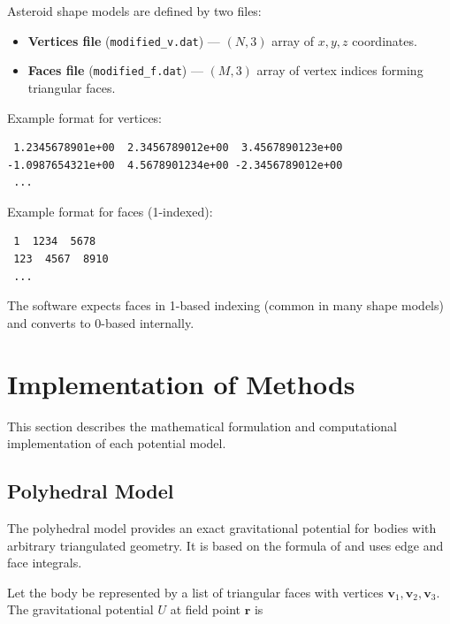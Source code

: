\documentclass[a4paper,12pt]{article}
\begin{document}
Asteroid shape models are defined by two files:
\begin{itemize}
    \item \textbf{Vertices file} (\texttt{modified\_v.dat}) — $(N, 3)$ array of $x, y, z$ coordinates.
    \item \textbf{Faces file} (\texttt{modified\_f.dat}) — $(M, 3)$ array of vertex indices forming triangular faces.
\end{itemize}

Example format for vertices:
\begin{verbatim}
 1.2345678901e+00  2.3456789012e+00  3.4567890123e+00
-1.0987654321e+00  4.5678901234e+00 -2.3456789012e+00
 ...
\end{verbatim}

Example format for faces (1-indexed):
\begin{verbatim}
 1  1234  5678
 123  4567  8910
 ...
\end{verbatim}

The software expects faces in 1-based indexing (common in many shape models) and converts to 0-based internally.

\section{Implementation of Methods}

This section describes the mathematical formulation and computational implementation of each potential model.

\subsection{Polyhedral Model}

The polyhedral model provides an exact gravitational potential for bodies with arbitrary triangulated geometry. It is based on the formula of \cite{werner1994gravitational} and uses edge and face integrals.

Let the body be represented by a list of triangular faces with vertices $\mathbf{v}_1, \mathbf{v}_2, \mathbf{v}_3$. The gravitational potential $U$ at field point $\mathbf{r}$ is
\end{document}
